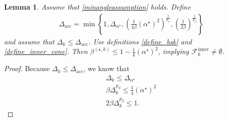 \documentclass{article}
\newtheorem{lemma}[theorem]{Lemma}
\theoremstyle{case}
\newcommand{\bsk}{{\beta^{(\star, k)}}}
\newcommand{\dacc}{{\Delta_{\text{acc}}}}
\newcommand{\dk}{\Delta_k}
\newcommand{\fcki}{{\mathcal {F}^{\text{inner}}_k}}
\newcommand{\minanglealpha}{{ \alpha^{\star} }}
\newcommand{\minangledelta}{{\Delta_{\alpha^{\star}}}}
\begin{document}
\begin{lemma}
\label{boundbeta}
Assume that \cref{minangleassumption} holds.
Define
\begin{align}
\dacc =\min\left\{
1,
\minangledelta,
\left(\frac 1 {4\beta} \left(\minanglealpha\right)^2\right)^{\frac 1 {p_{\beta}}},
\left(\frac 1 {2\beta}\right)^{\frac 1 {p_{\beta}}}
\right\}\label{define_boundedbeta_deltasmall}
\end{align}
and assume that $\dk \le \dacc$.
Use definitions \cref{define_bsk} and \cref{define_inner_cone}.
Then $\bsk \le 1 - \frac 1 4 (\minanglealpha)^2$, implying $\fcki \ne \emptyset$.
\end{lemma}

\begin{proof}
Because $\dk \le \dacc$, we know that
\begin{align}
\dk \le \minangledelta \label{boundedbeta_deltasmall_1} \\
\beta\dk^{p_{\beta}} \le \frac 1 {4} \left(\minanglealpha\right)^2 \label{boundedbeta_deltasmall_2} \\
2\beta\dk^{p_{\beta}} \le 1. \label{boundedbeta_deltasmall_3}
\end{align}


\end{proof}
\end{document}
